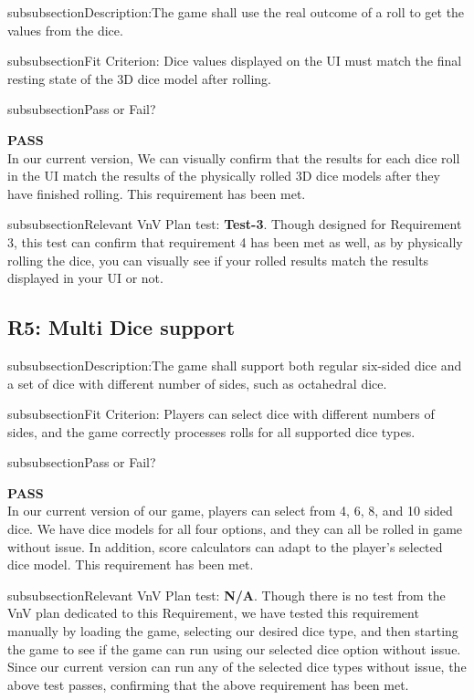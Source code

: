 \documentclass[12pt, titlepage]{article}
\begin{document}
\*subsubsection{Description:}The game shall use the real outcome of a roll to get the values from the dice.
  
\*subsubsection{Fit Criterion:} Dice values displayed on the UI must match the final resting state of the 3D dice model after rolling.

\*subsubsection{Pass or Fail?} 
 
  \noindent \textbf{PASS}\\
 
 \noindent In our current version, We can visually confirm that the results for each dice roll in the UI match the results of the physically rolled 3D dice models after they have finished rolling. This requirement has been met.
 
  \*subsubsection{Relevant VnV Plan test: } \textbf{ Test-3}. Though designed for Requirement 3, this test can confirm that requirement 4 has been met as well, as by physically rolling the dice, you can visually see if your rolled results match the results displayed in your UI or not.
  
\subsection{R5: Multi Dice support} 

\*subsubsection{Description:}The game shall support both regular six-sided dice and a set of dice with different number of sides, such as octahedral dice.

\*subsubsection{Fit Criterion:} Players can select dice with different numbers of sides, and the game correctly processes rolls for all supported dice types.

\*subsubsection{Pass or Fail?} 

 \noindent \textbf{PASS}\\
 
 \noindent In our current version of our game, players can select from 4, 6, 8, and 10 sided dice. We have dice models for all four options, and they can all be rolled in game without issue. In addition, score calculators can adapt to the player's selected dice model. This requirement has been met.

\*subsubsection{Relevant VnV Plan test: } \textbf{N/A}. Though there is no test from the VnV plan dedicated to this Requirement, we have tested this requirement manually by loading the game, selecting our desired dice type, and then starting the game to see if the game can run using our selected dice option without issue. Since our current version can run any of the selected dice types without issue, the above test passes, confirming that the above requirement has been met.
\end{document}

